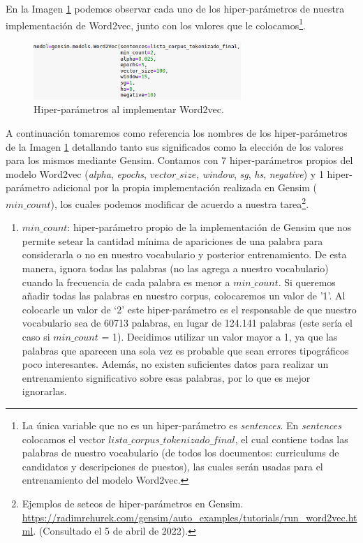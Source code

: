 \documentclass[12pt,a4paper]{article}
\begin{document}
\begin{sloppypar}
En la Imagen \ref{fig:4_Implementacion_Word2vec} podemos observar cada uno de los hiper-parámetros de nuestra implementación de Word2vec, junto con los valores que le colocamos\footnote{La única variable que no es un hiper-parámetro es \textit{sentences}. En \textit{sentences} colocamos el vector \textit{$lista\_corpus\_tokenizado\_final$}, el cual contiene todas las palabras de nuestro vocabulario (de todos los documentos: curriculums de candidatos y descripciones de puestos), las cuales serán usadas para el entrenamiento del modelo Word2vec.}.

\begin{figure}[H] 
 \centering
 \includegraphics[width=0.7\textwidth]{images/implementacion_5/4_Implementacion_Word2vec.png}
 \caption{Hiper-parámetros al implementar Word2vec.} 
 \label{fig:4_Implementacion_Word2vec}
\end{figure}

A continuación tomaremos como referencia los nombres de los hiper-parámetros de la Imagen \ref{fig:4_Implementacion_Word2vec} detallando tanto sus significados como la elección de los valores para los mismos mediante Gensim. Contamos con 7 hiper-parámetros propios del modelo Word2vec\cite{Implem_3} (\textit{alpha}, \textit{epochs}, \textit{$vector\_size$}, \textit{window}, \textit{sg}, \textit{hs}, \textit{negative}) y 1 hiper-parámetro adicional por la propia implementación realizada en Gensim (\textit{$min\_count$}), los cuales podemos modificar de acuerdo a nuestra tarea\footnote{Ejemplos de seteos de hiper-parámetros en Gensim. \url{https://radimrehurek.com/gensim/auto_examples/tutorials/run_word2vec.html}. (Consultado el 5 de abril de 2022).}.

\begin{enumerate}

\item \textit{$min\_count$}: hiper-parámetro propio de la implementación de Gensim que nos permite setear la cantidad mínima de apariciones de una palabra para considerarla o no en nuestro vocabulario y posterior entrenamiento. De esta manera, ignora todas las palabras (no las agrega a nuestro vocabulario) cuando la frecuencia de cada palabra es menor a \textit{$min\_count$}. Si queremos añadir todas las palabras en nuestro corpus, colocaremos un valor de '1'. Al colocarle un valor de ‘2’ este hiper-parámetro es el responsable de que nuestro vocabulario sea de 60713 palabras, en lugar de 124.141 palabras (este sería el caso si \textit{$min\_count$} = 1). Decidimos utilizar un valor mayor a 1, ya que las palabras que aparecen una sola vez es probable que sean errores tipográficos poco interesantes. Además, no existen suficientes datos para realizar un entrenamiento significativo sobre esas palabras, por lo que es mejor ignorarlas.


\end{enumerate}
\end{sloppypar}
\end{document}
